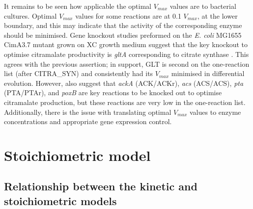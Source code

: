 \documentclass[parskip=full, numbers=noenddot]{scrreprt}
\begin{document}

It remains to be seen how applicable the optimal $V_{max}$ values are to bacterial cultures. Optimal $V_{max}$ values for some reactions are at 0.1 $V_{max}$, at the lower boundary, and this may indicate that the activity of the corresponding enzyme should be minimised. Gene knockout studies preformed on the \emph{E. coli} MG1655 CimA3.7 mutant grown on XC growth medium suggest that the key knockout to optimise citramalate productivity is \emph{gltA} corresponding to citrate synthase \citep{wu_production_2016}. This agrees with the previous assertion; in support, GLT is second on the one-reaction list (after CITRA\_SYN) and consistently had its $V_{max}$ minimised in differential evolution. However, \citet{wu_production_2016} also suggest that \emph{ackA} (ACK/ACKr), \emph{acs} (ACS/ACS), \emph{pta} (PTA/PTAr), and \emph{poxB} are key reactions to be knocked out to optimise citramalate production, but these reactions are very low in the one-reaction list.
Additionally, there is the issue with translating optimal $V_{max}$ values to enzyme concentrations and appropriate gene expression control. 




\section{Stoichiometric model}
\label{sec:discussion-stoichiometric}

\subsection{Relationship between the kinetic and stoichiometric models}
\label{ssec:discussion-stoichiometric-ks}
\end{document}

